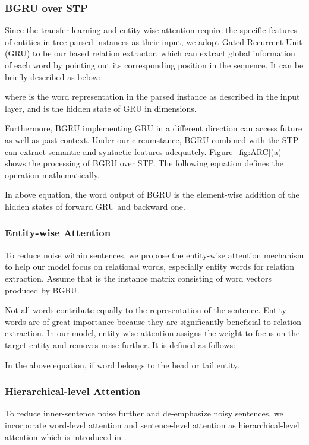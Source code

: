 \documentclass[11pt,a4paper]{article}
\begin{document}
  \subsubsection*{BGRU over STP}
  Since the transfer learning and entity-wise attention require the specific features of entities in tree parsed instances as their input, we adopt Gated Recurrent Unit (GRU) \citep{cho2014learning} to be our based relation extractor, which can extract global information of each word by pointing out its corresponding position in the sequence. It can be briefly described as below:
  
  where  is the  word representation in the  parsed instance as described in the input layer, and  is the hidden state of GRU in  dimensions.
  
  Furthermore, BGRU implementing GRU in a different direction can access future as well as past context. Under our circumstance, BGRU combined with the STP can extract semantic and syntactic features adequately. Figure~\ref{fig:ARC}(a) shows the processing of BGRU over STP. The following equation defines the operation mathematically.
  
  In above equation, the  word output  of BGRU is the element-wise addition of the  hidden states of forward GRU and backward one.

  \subsubsection*{Entity-wise Attention}
  To reduce noise within sentences, we propose the entity-wise attention mechanism to help our model focus on relational words, especially entity words for relation extraction. Assume that  is the  instance matrix consisting of  word vectors  produced by BGRU.

  Not all words contribute equally to the representation of the sentence. Entity words are of great importance because they are significantly beneficial to relation extraction. In our model, entity-wise attention assigns the weight  to focus on the target entity and removes noise further. It is defined as follows:
  
  In the above equation,  if  word belongs to the head or tail entity.

  \subsubsection*{Hierarchical-level Attention}
  To reduce inner-sentence noise further and de-emphasize noisy sentences, we incorporate word-level attention and sentence-level attention as hierarchical-level attention which is introduced in \citet{yang2016hierarchical}.
  
\end{document}
